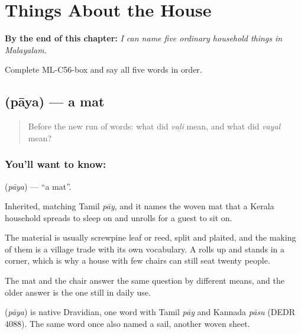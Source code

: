 
\chapter{Things About the House}
\label{ch:ml-things-about-the-house}

\begin{chapteropening}
\textbf{By the end of this chapter:} \emph{I can name five ordinary household things in Malayalam.}

Complete ML-C56-box and say all five words in order.
\end{chapteropening}

\section[\texorpdfstring{\ml{പായ} (pāya)}{പായ (pāya)}]{ (pāya) — a mat}

\label{lesson:ML-C56-mat}



\begin{quote}
Before the new run of words: what did \emph{vaḻi} mean, and what did \emph{vayal} mean?
\end{quote}

\subsection*{You'll want to know: }
\textbf{} (\emph{pāya}) — \textquotedblleft{}a mat\textquotedblright{}.

Inherited, matching Tamil \emph{pāy}, and it names the woven mat that a Kerala household spreads to sleep on and unrolls for a guest to sit on.

The material is usually screwpine leaf or reed, split and plaited, and the making of them is a village trade with its own vocabulary. A  rolls up and stands in a corner, which is why a house with few chairs can still seat twenty people.

The mat and the chair answer the same question by different means, and the older answer is the one still in daily use.

\begin{cousinweb}
\textbf{} (\emph{pāya}) is native Dravidian, one word with Tamil \emph{pāy} and Kannada \emph{pāsu} (DEDR 4088). The same word once also named a sail, another woven sheet.
\end{cousinweb}

